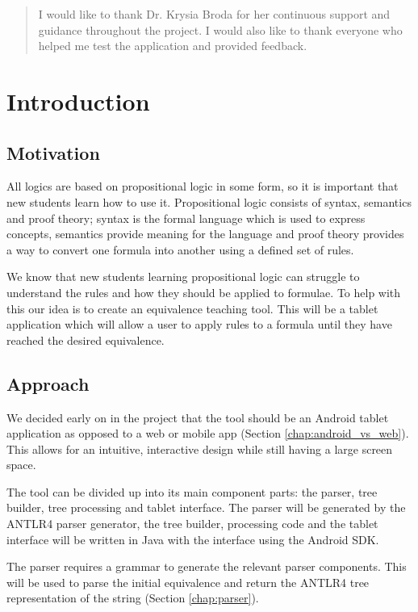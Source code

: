 \documentclass{report}
\begin{document}
\renewcommand{\abstractname}{Acknowledgements}
\begin{abstract}
I would like to thank Dr. Krysia Broda for her continuous support and guidance throughout the project. I would also like to thank everyone who helped me test the application and provided feedback.
\end{abstract}

\tableofcontents

\chapter{Introduction}

\section{Motivation}

All logics are based on propositional logic in some form, so it is important that new students learn how to use it. Propositional logic consists of syntax, semantics and proof theory; syntax is the formal language which is used to express concepts, semantics provide meaning for the language and proof theory provides a way to convert one formula into another using a defined set of rules.

We know that new students learning propositional logic can struggle to understand the rules and how they should be applied to formulae. To help with this our idea is to create an equivalence teaching tool. This will be a tablet application which will allow a user to apply rules to a formula until they have reached the desired equivalence.

\section{Approach}

We decided early on in the project that the tool should be an Android tablet application as opposed to a web or mobile app (Section \ref{chap:android_vs_web}). This allows for an intuitive, interactive design while still having a large screen space.

The tool can be divided up into its main component parts: the parser, tree builder, tree processing and tablet interface. The parser will be generated by the ANTLR4 parser generator, the tree builder, processing code and the tablet interface will be written in Java with the interface using the Android SDK.

The parser requires a grammar to generate the relevant parser components. This will be used to parse the initial equivalence and return the ANTLR4 tree representation of the string (Section \ref{chap:parser}).
\end{document}
